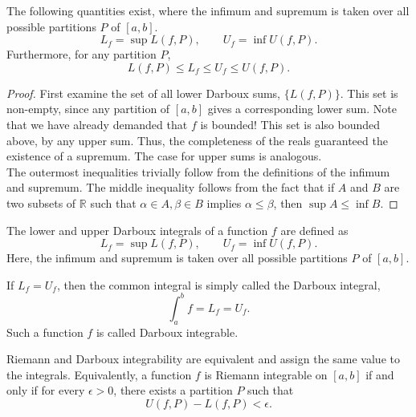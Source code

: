 \documentclass[11pt]{article}
\def\R{\mathbb{R}}
\theoremstyle{definition}
\theoremstyle{remark}
\numberwithin{equation}{module}
\begin{document}
    \begin{corollary}
        The following quantities exist, where the infimum and supremum is taken over
        all possible partitions $P$ of $[a, b]$. \[
            L_f = \sup L(f, P), \qquad U_f = \inf U(f, P).
        \] Furthermore, for any partition $P$, \[
            L(f, P) \leq L_f \leq U_f \leq U(f, P).
        \] 
    \end{corollary}
    \begin{proof}
        First examine the set of all lower Darboux sums, $\{L(f, P)\}$. This set is
        non-empty, since any partition of $[a, b]$ gives a corresponding lower sum.
        Note that we have already demanded that $f$ is bounded!
        This set is also bounded above, by any upper sum. Thus, the completeness of
        the reals guaranteed the existence of a supremum. The case for upper sums is
        analogous. \\

        \noindent The outermost inequalities trivially follow from the definitions
        of the infimum and supremum. The middle inequality follows from the fact
        that if $A$ and $B$ are two subsets of $\R$ such that $\alpha \in A, \beta
        \in B$ implies $\alpha \leq \beta$, then $\sup{A} \leq \inf{B}$.
    \end{proof}
    
    \begin{definition}
        The lower and upper Darboux integrals of a function $f$ are defined as \[
            L_f = \sup L(f, P), \qquad U_f = \inf U(f, P).
        \] Here, the infimum and supremum is taken over all possible partitions $P$
        of $[a, b]$.

        If $L_f = U_f$, then the common integral is simply called the Darboux
        integral, \[
            \int_a^b f = L_f = U_f.
        \] Such a function $f$ is called Darboux integrable.
    \end{definition}
    
    \begin{theorem}
        Riemann and Darboux integrability are equivalent and assign the same value
        to the integrals. Equivalently, a function $f$ is Riemann integrable on $[a,
        b]$ if and only if for every $\epsilon > 0$, there exists a partition $P$
        such that \[
            U(f, P) - L(f, P) < \epsilon.
        \] 
    \end{theorem}
\end{document}
